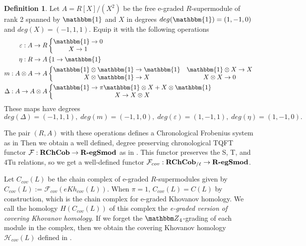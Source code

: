 \documentclass{amsart}
\theoremstyle{plain}
\theoremstyle{definition}
\newtheorem{definition}[theorem]{Definition}
\theoremstyle{definition}
\numberwithin{equation}{section}
\numberwithin{theorem}{section}
\newcommand{\cat}[1]{\ensuremath{\mbox{\bfseries {\upshape {#1}}}}}
\renewcommand{\to}{\rightarrow}
\numberwithin{equation}{section}
\def\Z{{\mathbbm Z}}
\def\1{\mathbbm{1}}%
\begin{document}
\begin{definition}
  Let $A=R[X]/(X^2)$ be the free e-graded $R$-supermodule of rank 2 spanned by $\1$ and $X$ in degrees $deg(\1)=(1,-1,0)$ and $deg(X)=(-1,1,1)$.
  Equip it with the following operations
  \begin{align}\label{Frob-str-1}
  \varepsilon: A\to R & \left\{\begin{matrix}
                                \1 \to 0 \\
                                X\to 1
                              \end{matrix} \right.\\
  \eta: R\to A & \left\{ 1\to \1 \right. \\
  m:A\otimes A \to A & \left\{  \begin{matrix}
                                  \1 \otimes \1 \to \1 & \1\otimes X \to X \\
                                  X\otimes \1 \to X & X\otimes X \to 0
                                \end{matrix}  \right. \\
  \Delta: A\to A\otimes A & \left\{ \begin{matrix}
                                      \1 \to \pi \1\otimes X + X \otimes \1 \\
                                      X \to X \otimes X
                                    \end{matrix}\right.
\end{align}
These maps have degrees
\[deg(\Delta)=(-1,1,1), \; deg(m)=(-1,1,0), \;deg(\varepsilon)=(1,-1,1), \; deg(\eta)=(1,-1,0).\]
\end{definition}

The pair $(R,A)$ with these operations defines a Chronological Frobenius system as in \cite[Definition 10.5]{P}
Then we obtain a well defined, degree preserving chronological TQFT functor $\mathcal{F}:\cat{RChCob}\to \cat{R-egSmod}$ as in \cite[Proposition 10.6]{P}.
This functor preserves the S, T, and 4Tu relations, so we get a well-defined functor $\mathcal{F}_{cov}:\cat{RChCob}_{/\ell} \to \cat{R-egSmod}$.

Let $C_{cov}(L)$ be the chain complex of e-graded $R$-supermodules given by $C_{cov}(L):=\mathcal{F}_{cov}(eKh_{cov}(L))$.
When $\pi=1$, $C_{cov}(L)=C(L)$ by construction, which is the chain complex for e-graded Khovanov homology.
We call the homology $H(C_{cov}(L))$ of this complex the \emph{e-graded version of covering Khovanov homology}.
If we forget the $\Z_4$-grading of each module in the complex, then we obtain the covering Khovanov homology $\mathcal{H}_{cov}(L)$ defined in \cite[Example 10.7]{P}.





\end{document}
